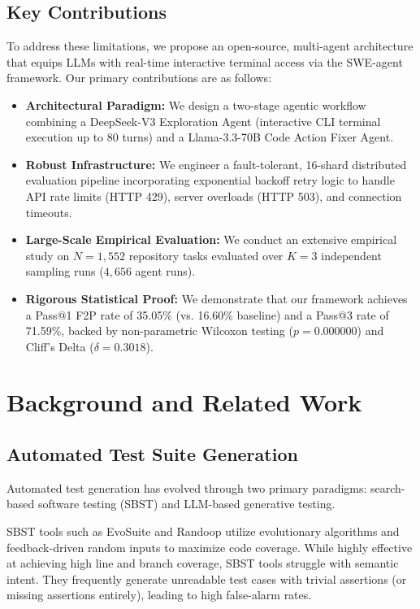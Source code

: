 \documentclass[conference]{IEEEtran}
\begin{document}
\subsection{Key Contributions}
To address these limitations, we propose an open-source, multi-agent architecture that equips LLMs with real-time interactive terminal access via the SWE-agent framework. Our primary contributions are as follows:
\begin{itemize}
    \item \textbf{Architectural Paradigm:} We design a two-stage agentic workflow combining a DeepSeek-V3 Exploration Agent (interactive CLI terminal execution up to 80 turns) and a Llama-3.3-70B Code Action Fixer Agent.
    \item \textbf{Robust Infrastructure:} We engineer a fault-tolerant, 16-shard distributed evaluation pipeline incorporating exponential backoff retry logic to handle API rate limits (HTTP 429), server overloads (HTTP 503), and connection timeouts.
    \item \textbf{Large-Scale Empirical Evaluation:} We conduct an extensive empirical study on $N=1,552$ repository tasks evaluated over $K=3$ independent sampling runs ($4,656$ agent runs).
    \item \textbf{Rigorous Statistical Proof:} We demonstrate that our framework achieves a Pass@1 F2P rate of 35.05\% (vs. 16.60\% baseline) and a Pass@3 rate of 71.59\%, backed by non-parametric Wilcoxon testing ($p=0.000000$) and Cliff's Delta ($\delta = 0.3018$).
\end{itemize}

\section{Background and Related Work}

\subsection{Automated Test Suite Generation}
Automated test generation has evolved through two primary paradigms: search-based software testing (SBST) and LLM-based generative testing.

SBST tools such as EvoSuite and Randoop utilize evolutionary algorithms and feedback-driven random inputs to maximize code coverage. While highly effective at achieving high line and branch coverage, SBST tools struggle with semantic intent. They frequently generate unreadable test cases with trivial assertions (or missing assertions entirely), leading to high false-alarm rates.
\end{document}
